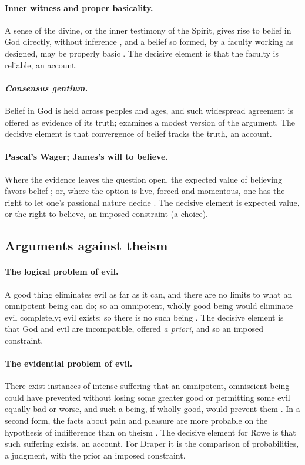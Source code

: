 \paragraph{Inner witness and proper basicality.} A sense of the divine, or the inner testimony of the
Spirit, gives rise to belief in God directly, without inference \citep[I.3.1, I.7.4]{calvin1559},
and a belief so formed, by a faculty working as designed, may be properly basic
\citep{plantinga2000}. The decisive element is that the faculty is reliable, an account.

\paragraph{\emph{Consensus gentium}.} Belief in God is held across peoples and ages, and such
widespread agreement is offered as evidence of its truth; \citet{kelly2011} examines a modest version
of the argument. The decisive element is that convergence of belief tracks the truth, an account.

\paragraph{Pascal's Wager; James's will to believe.} Where the evidence leaves the question open, the
expected value of believing favors belief \citep{pascal1670}; or, where the option is live, forced
and momentous, one has the right to let one's passional nature decide \citep{james1896}. The
decisive element is expected value, or the right to believe, an imposed constraint (a choice).

\subsection{Arguments against theism}\label{ss:arguments-against}

\paragraph{The logical problem of evil.} A good thing eliminates evil as far as it can, and there are
no limits to what an omnipotent being can do; so an omnipotent, wholly good being would eliminate
evil completely; evil exists; so there is no such being \citep{mackie1955}. The decisive element is
that God and evil are incompatible, offered \emph{a priori}, and so an imposed constraint.

\paragraph{The evidential problem of evil.} There exist instances of intense suffering that an
omnipotent, omniscient being could have prevented without losing some greater good or permitting
some evil equally bad or worse, and such a being, if wholly good, would prevent them
\citep{rowe1979}. In a second form, the facts about pain and pleasure are more probable on the
hypothesis of indifference than on theism \citep{draper1989}. The decisive element for Rowe is that
such suffering exists, an account. For Draper it is the comparison of probabilities, a judgment,
with the prior an imposed constraint.

